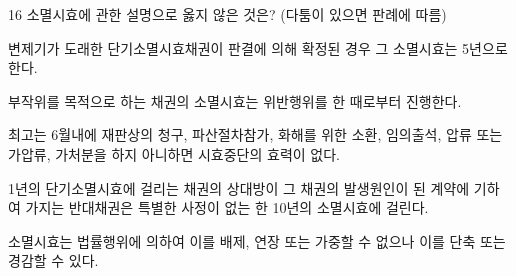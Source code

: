 \begin{question}{16}
소멸시효에 관한 설명으로 옳지 않은 것은? (다툼이 있으면 판례에 따름)
\begin{choices}
  \item 변제기가 도래한 단기소멸시효채권이 판결에 의해 확정된 경우 그 소멸시효는 5년으로 한다.
  \item 부작위를 목적으로 하는 채권의 소멸시효는 위반행위를 한 때로부터 진행한다.
  \item 최고는 6월내에 재판상의 청구, 파산절차참가, 화해를 위한 소환, 임의출석, 압류 또는 가압류, 가처분을 하지 아니하면 시효중단의 효력이 없다.
  \item 1년의 단기소멸시효에 걸리는 채권의 상대방이 그 채권의 발생원인이 된 계약에 기하여 가지는 반대채권은 특별한 사정이 없는 한 10년의 소멸시효에 걸린다.
  \item 소멸시효는 법률행위에 의하여 이를 배제, 연장 또는 가중할 수 없으나 이를 단축 또는 경감할 수 있다.
\end{choices}
\end{question}
